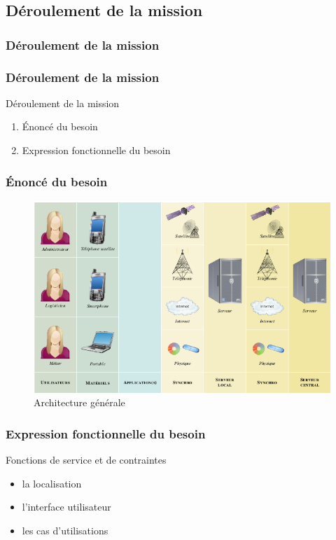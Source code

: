 \subsection{Déroulement de la mission}

\subsubsection{Déroulement de la mission}

\begin{frame}
\frametitle{Déroulement de la mission}
\begin{block}{Déroulement de la mission}
	\begin{enumerate}
	\item Énoncé du besoin
	\item Expression fonctionnelle du besoin
	
	\end{enumerate}
	\end{block}
\end{frame}
  
\begin{frame}
	\frametitle{Énoncé du besoin}
	\begin{figure}[htbp]
	\centering
	\includegraphics[scale=0.35]{Images/architecture.png}
	\caption{Architecture générale}
	\end{figure}
\end{frame}

\begin{frame}
\frametitle{Expression fonctionnelle du besoin}
\begin{block}{Fonctions de service et de contraintes}
\begin{itemize}
\item la localisation
\item l'interface utilisateur
\item les cas d'utilisations
\end{itemize}
\end{block}
\end{frame}

